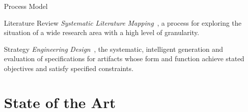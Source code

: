 \documentclass[10pt]{beamer}
\begin{document}
\begin{frame}{Process Model}

\begin{alertblock}{Literature Review}
    \smallskip
    \emph{Systematic Literature Mapping}~\cite{Petersen2007}, a process for exploring
    the situation of a wide research area with a high level of granularity.
\end{alertblock}

\begin{alertblock}{Strategy}
    \smallskip
    \emph{Engineering Design}~\cite{Dym2012}, the systematic, intelligent generation and evaluation
    of specifications for artifacts whose form and function achieve stated objectives and satisfy specified
    constraints.
\end{alertblock}



\end{frame}

\section{State of the Art}
\end{document}
